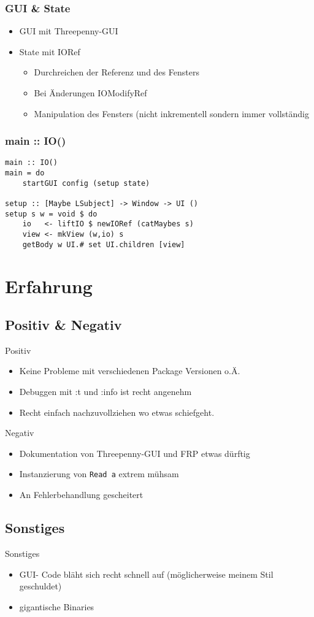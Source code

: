 \documentclass{beamer}
\begin{document}
\begin{frame}[fragile]\frametitle{GUI \& State}

\begin{itemize}
\item GUI mit Threepenny-GUI
\item State mit IORef
\begin{itemize}
\item Durchreichen der Referenz und des Fensters 
\item Bei Änderungen IOModifyRef
\item Manipulation des Fensters (nicht inkrementell sondern immer vollständig
\end{itemize}
\end{itemize}
\end{frame}



\begin{frame}[fragile]
\frametitle{main :: IO()}
\begin{lstlisting}[language=HaskellUlisses]
main :: IO()
main = do
	startGUI config (setup state)

setup :: [Maybe LSubject] -> Window -> UI ()
setup s w = void $ do
    io   <- liftIO $ newIORef (catMaybes s)
    view <- mkView (w,io) s
    getBody w UI.# set UI.children [view]
\end{lstlisting}
\end{frame}

\section{Erfahrung}
\subsection{Positiv \& Negativ}
\begin{frame}[fragile]
Positiv
\begin{itemize}
\item Keine Probleme mit verschiedenen Package Versionen o.Ä.
\item Debuggen mit :t und :info ist recht angenehm
\item Recht einfach nachzuvollziehen wo etwas schiefgeht.
\end{itemize}
Negativ
\begin{itemize}
\item Dokumentation von Threepenny-GUI und FRP etwas dürftig
\item Instanzierung von \lstinline[language=HaskellUlisses]{Read a} extrem mühsam
\item An Fehlerbehandlung gescheitert
\end{itemize}
\end{frame}

\subsection{Sonstiges}
\begin{frame}Sonstiges
\begin{itemize}
\item GUI- Code bläht sich recht schnell auf (möglicherweise meinem Stil geschuldet)
\item gigantische Binaries
\end{itemize}
\end{frame}
\end{document}
